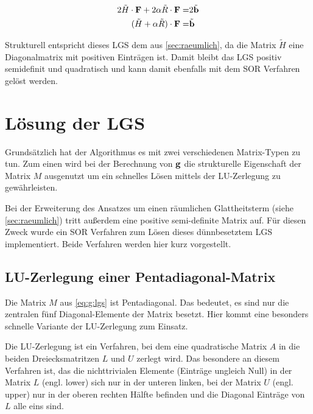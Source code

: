 \begin{align}
2 \tilde H \cdot \mathbf F + 2 \alpha \tilde R\cdot \mathbf F =& 2 \tilde{\mathbf b} \\
(\tilde H+\alpha \tilde R)\cdot \mathbf F =& \tilde{\mathbf b}
\end{align}

Strukturell entspricht dieses LGS dem aus \autoref{sec:raeumlich}, da die Matrix $\tilde H$ eine Diagonalmatrix mit positiven Einträgen ist. Damit bleibt das LGS positiv semidefinit und quadratisch und kann damit ebenfalls mit dem \gls{SOR} Verfahren gelöst werden.




\section{Lösung der \gls{LGS}}
Grundsätzlich hat der Algorithmus es mit zwei verschiedenen Matrix-Typen zu tun. Zum einen wird bei der Berechnung von $\mathbf g$ die strukturelle Eigenschaft der Matrix $M$ ausgenutzt um ein schnelles Lösen mittels der LU-Zerlegung zu gewährleisten.

Bei der Erweiterung des Ansatzes um einen räumlichen Glattheitsterm (siehe \autoref{sec:raeumlich}) tritt außerdem eine positive semi-definite Matrix auf. Für diesen Zweck wurde ein \gls{SOR} Verfahren zum Lösen dieses dünnbesetztem \gls{LGS} implementiert. Beide Verfahren werden hier kurz vorgestellt.



\subsection{LU-Zerlegung einer Pentadiagonal-Matrix}
\label{sec:maths:lu}
Die Matrix $M$ aus \autoref{eq:g:lgs} ist Pentadiagonal. Das bedeutet, es sind nur die zentralen fünf Diagonal-Elemente der Matrix besetzt. Hier kommt eine besonders schnelle Variante der LU-Zerlegung zum Einsatz.

Die LU-Zerlegung ist ein Verfahren, bei dem eine quadratische Matrix $A$ in die beiden Dreiecksmatritzen $L$ und $U$ zerlegt wird. Das besondere an diesem Verfahren ist, das die nichttrivialen Elemente (Einträge ungleich Null) in der Matrix $L$ (engl. lower) sich nur in der unteren linken, bei der Matrix $U$ (engl. upper) nur in der oberen rechten Hälfte befinden und die Diagonal Einträge von $L$ alle eins sind. 


